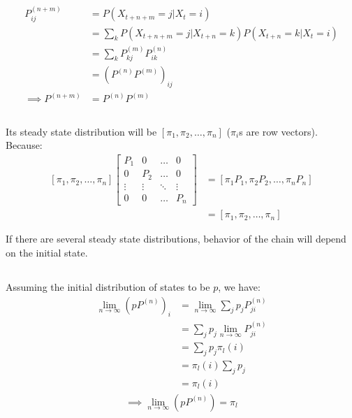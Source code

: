 \documentclass{article}
\begin{document}


\subsection{}
\begin{align*}
P_{ij}^{(n + m)} &= P(X_{t+n+m}=j|X_t=i)\\
&= \sum_{k} P(X_{t+n+m}=j|X_{t+n}=k) P(X_{t+n}=k|X_t=i)\\
&= \sum_{k} P_{kj}^{(m)} P_{ik}^{(n)}\\
&= (P^{(n)} P^{(m)})_{ij}\\
\implies P^{(n+m)} &= P^{(n)} P^{(m)}
\end{align*}

\subsection{}
Its steady state distribution will be \(\left[\pi_1, \pi_2, \dots, \pi_n\right]\) (\(\pi_i\)s are row vectors).
Because:
\begin{align*}
\left[\pi_1, \pi_2, \dots, \pi_n\right] \begin{bmatrix}
P_{1} & 0 & \dots & 0\\
0 & P_{2} & \dots & 0\\
\vdots & \vdots & \ddots & \vdots\\
0 & 0 & \dots & P_{n}
\end{bmatrix}
&= \left[\pi_1P_{1}, \pi_2P_{2}, \dots, \pi_nP_{n}\right]\\
&= \left[\pi_1, \pi_2, \dots, \pi_n\right]
\end{align*}

If there are several steady state distributions, behavior of the chain will depend on the initial state.

\subsection{}
Assuming the initial distribution of states to be \(p\), we have:
\begin{align*}
\lim_{n \to \infty} (p P^{(n)})_i &= \lim_{n \to \infty} \sum_{j} p_j P^{(n)}_{ji}\\
&= \sum_{j} p_j \lim_{n \to \infty} P^{(n)}_{ji}\\
&= \sum_{j} p_j \pi_l(i)\\
&= \pi_l(i) \sum_{j} p_j\\
&= \pi_l(i)
\end{align*}
\begin{align*}
\implies \lim_{n \to \infty} (p P^{(n)}) = \pi_l
\end{align*}
\end{document}
